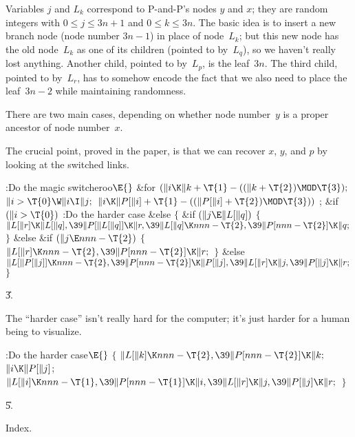 Variables $j$ and $L_k$ correspond to P-and-P's nodes
$y$ and $x$;
they are random integers with $0\le j\le 3n+1$ and $0\le k\le3n$.
The basic idea is to insert a new branch node (node number $3n-1$)
in place of node~$L_k$; but this new node has the old node~$L_k$ as
one of its children (pointed to by~$L_q$), so we haven't really
lost anything. Another child,
pointed to by~$L_p$, is the leaf~$3n$. The third child, pointed
to by~$L_r$, has to somehow encode the fact that we also need
to place the leaf~$3n-2$ while maintaining randomness.

There are two main cases, depending on whether node number~$y$ is
a proper ancestor of node number~$x$.

The crucial point, proved in the paper, is that we can recover
$x$, $y$, and $p$ by looking at the switched links.

\fi

\B{}:Do the magic switcheroo\X${}\E{}$\6
\&{for} ${}(\|i\K\|k+\T{1}-((\|k+\T{2})\MOD\T{3});{}$ ${}\|i>\T{0}\W\|i\I%
\|j;{}$ ${}\|i\K\|P[\|i]+\T{1}-((\|P[\|i]+\T{2})\MOD\T{3})){}$\1\5
;\2\6
\&{if} ${}(\|i>\T{0}){}$\1\5
:Do the harder case\X\2\6
\&{else}\5
${}\{{}$\1\6
\&{if} ${}(\|j\E\|L[\|q]){}$\5
${}\{{}$\1\6
${}\|L[\|r]\K\|L[\|q],\39\|P[\|L[\|q]]\K\|r,\39\|L[\|q]\K\\{nnn}-\T{2},\39\|P[%
\\{nnn}-\T{2}]\K\|q;{}$\6
\4${}\}{}$\5
\2\&{else} \&{if} ${}(\|j\E\\{nnn}-\T{2}){}$\5
${}\{{}$\1\6
${}\|L[\|r]\K\\{nnn}-\T{2},\39\|P[\\{nnn}-\T{2}]\K\|r;{}$\6
\4${}\}{}$\5
\2\&{else}\1\5
${}\|L[\|P[\|j]]\K\\{nnn}-\T{2},\39\|P[\\{nnn}-\T{2}]\K\|P[\|j],\39\|L[\|r]\K%
\|j,\39\|P[\|j]\K\|r;{}$\2\6
\4${}\}{}$\2\par
\U3.\fi

The ``harder case'' isn't really hard for the
computer;
it's just harder for a human being to visualize.

\Y\B\4:Do the harder case\X${}\E{}$\6
${}\{{}$\1\6
${}\|L[\|k]\K\\{nnn}-\T{2},\39\|P[\\{nnn}-\T{2}]\K\|k;{}$\6
${}\|i\K\|P[\|j]{}$;\6
${}\|L[\|i]\K\\{nnn}-\T{1},\39\|P[\\{nnn}-\T{1}]\K\|i,\39\|L[\|r]\K\|j,\39\|P[%
\|j]\K\|r;{}$\6
\4${}\}{}$\2\par
\U5.\fi

Index.
\fi

\inx
\fin
\con

